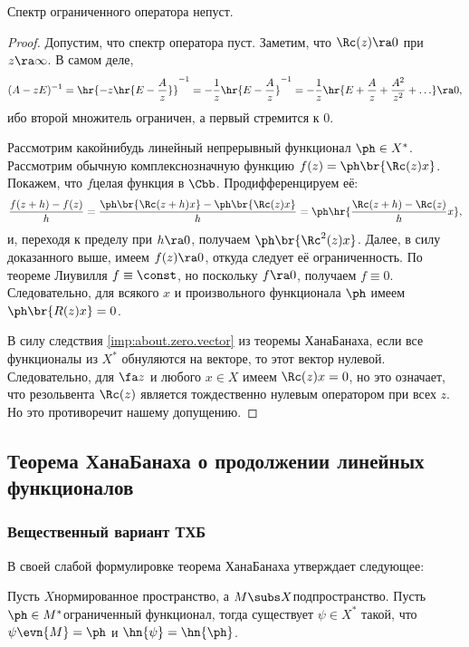 \documentclass[a4paper]{article}
\begin{document}
\begin{theorem}
Спектр ограниченного оператора непуст.
\end{theorem}
\begin{proof}
Допустим, что спектр оператора пуст. Заметим, что $\Rc(z) \ra 0$ при $z \ra \infty$. В самом деле,
$$(A - zE)^{-1} = \hr{-z\hr{E - \frac{A}{z}}}^{-1} = -\frac{1}{z}\hr{E - \frac{A}{z}}^{-1}=
-\frac{1}{z}\hr{E + \frac{A}{z} + \frac{A^2}{z^2}+\ldots} \ra 0,$$
ибо второй множитель ограничен, а первый стремится к $0$.

Рассмотрим какой\д нибудь линейный непрерывный функционал $\ph \in X^*$. Рассмотрим обычную
комплекснозначную функцию
$f(z) = \ph\br{\Rc(z)x}$. Покажем, что $f$\т целая функция в $\Cbb$.
Продифференцируем её:
$$\frac{f(z+h) - f(z)}{h} = \frac{\ph\br{\Rc(z+h)x} - \ph\br{\Rc(z)x}}{h} = \ph\hr{\frac{\Rc(z+h)-\Rc(z)}{h}x},$$
и, переходя к пределу при $h \ra 0$, получаем $\ph\br{\Rc^2(z)x}$.
Далее, в силу доказанного выше, имеем $f(z) \ra 0$, откуда следует её ограниченность.
По теореме Лиувилля $f \equiv \const$, но поскольку
$f \ra 0$, получаем $f \equiv 0$. Следовательно, для всякого $x$ и произвольного функционала $\ph$
имеем $\ph\br{R(z)x}=0$.

В силу следствия \ref{imp:about.zero.vector} из теоремы Хана\ч Банаха, если все функционалы
из $X^*$ обнуляются на векторе,
то этот вектор нулевой. Следовательно, для $\fa z$ и любого $x \in X$ имеем $\Rc(z)x = 0$,
но это означает, что резольвента $\Rc(z)$ является тождественно нулевым оператором при
всех $z$. Но это противоречит нашему допущению.
\end{proof}

\subsection{Теорема Хана\ч Банаха о продолжении линейных функционалов}

\subsubsection{Вещественный вариант ТХБ}

В своей слабой формулировке теорема Хана\ч Банаха утверждает следующее:

\begin{theorem}
Пусть $X$\т нормированное пространство, а $M \subs X$\т подпространство.
Пусть $\ph \in M^*$\т ограниченный функционал, тогда
существует $\psi \in X^*$ такой, что $\psi\evn{M} = \ph$ и $\hn{\psi} = \hn{\ph}$.
\end{theorem}
\end{document}
